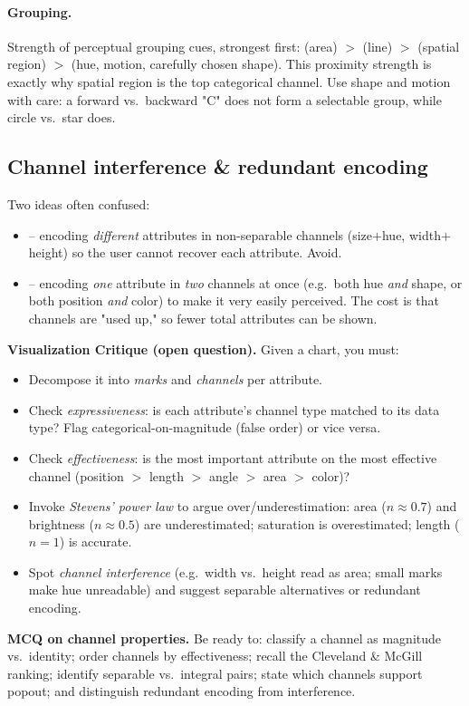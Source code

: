 \paragraph{Grouping.} Strength of perceptual grouping cues, strongest first:
 (area) $>$  (line) $>$ 
(spatial region) $>$  (hue, motion, carefully chosen shape).
This proximity strength is exactly why spatial region is the top categorical
channel. Use shape and motion with care: a forward vs.\ backward "C" does not
form a selectable group, while circle vs.\ star does.

\subsection{Channel interference \& redundant encoding}

Two ideas often confused:
\begin{itemize}
  \item {} -- encoding \emph{different} attributes in
        non-separable channels (size$+$hue, width$+$height) so the user cannot
        recover each attribute. Avoid.
  \item {} -- encoding \emph{one} attribute in
        \emph{two} channels at once (e.g.\ both hue \emph{and} shape, or both
        position \emph{and} color) to make it very easily perceived. The cost is
        that channels are "used up," so fewer total attributes can be shown.
\end{itemize}

\begin{exambox}
\textbf{Visualization Critique (open question).} Given a chart, you must:
\begin{itemize}[leftmargin=1.4em]
  \item Decompose it into \emph{marks} and \emph{channels} per attribute.
  \item Check \emph{expressiveness}: is each attribute's channel type matched to
        its data type? Flag categorical-on-magnitude (false order) or vice versa.
  \item Check \emph{effectiveness}: is the most important attribute on the most
        effective channel (position $>$ length $>$ angle $>$ area $>$ color)?
  \item Invoke \emph{Stevens' power law} to argue over/underestimation: area
        ($n\approx0.7$) and brightness ($n\approx0.5$) are underestimated;
        saturation is overestimated; length ($n=1$) is accurate.
  \item Spot \emph{channel interference} (e.g.\ width vs.\ height read as area;
        small marks make hue unreadable) and suggest separable alternatives or
        redundant encoding.
\end{itemize}
\textbf{MCQ on channel properties.} Be ready to: classify a channel as magnitude
vs.\ identity; order channels by effectiveness; recall the Cleveland \& McGill
ranking; identify separable vs.\ integral pairs; state which channels support
popout; and distinguish redundant encoding from interference.
\end{exambox}

